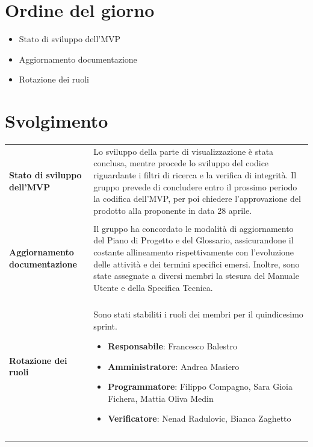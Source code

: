 \documentclass[a4paper,12pt]{article}
\begin{document}


\newpage
\tableofcontents
\newpage

\markright{}

\newpage
\section{Ordine del giorno}

\begin{itemize}
    \item Stato di sviluppo dell'MVP
    \item Aggiornamento documentazione
    \item Rotazione dei ruoli
\end{itemize}

\section{Svolgimento}
\begin{longtable}{P{4cm}|P{9cm}}
\textbf{Stato di sviluppo dell'MVP} & Lo sviluppo della parte di visualizzazione è stata conclusa, mentre procede lo sviluppo del codice riguardante i filtri di ricerca e la verifica di integrità. Il gruppo prevede di concludere entro il prossimo periodo la codifica dell'MVP, per poi chiedere l'approvazione del prodotto alla proponente in data 28 aprile.\\
\\
\textbf{Aggiornamento documentazione} & 
Il gruppo ha concordato le modalità di aggiornamento del Piano di Progetto e del Glossario, assicurandone il costante allineamento rispettivamente con l’evoluzione delle attività e dei termini specifici emersi. Inoltre, sono state assegnate a diversi membri la stesura del Manuale Utente e della Specifica Tecnica.\\
\\
\textbf{Rotazione dei ruoli} & Sono stati stabiliti i ruoli dei membri per il quindicesimo sprint.
            \begin{itemize}
                    \item \textbf{Responsabile}: Francesco Balestro
                \item \textbf{Amministratore}: Andrea Masiero
                \item \textbf{Programmatore}: Filippo Compagno, Sara Gioia Fichera, Mattia Oliva Medin
                \item \textbf{Verificatore}: Nenad Radulovic, Bianca Zaghetto
            \end{itemize}\\\\
\\
\end{longtable}
\end{document}
